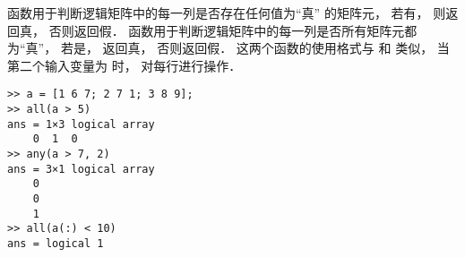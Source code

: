  函数用于判断逻辑矩阵中的每一列是否存在任何值为“真” 的矩阵元， 若有， 则返回真， 否则返回假．  函数用于判断逻辑矩阵中的每一列是否所有矩阵元都为“真”， 若是， 返回真， 否则返回假． 这两个函数的使用格式与  和  类似， 当第二个输入变量为  时， 对每行进行操作．
\begin{lstlisting}[language=MatlabCom]
>> a = [1 6 7; 2 7 1; 3 8 9];
>> all(a > 5)
ans = 1×3 logical array
    0  1  0
>> any(a > 7, 2)
ans = 3×1 logical array
    0
    0
    1
>> all(a(:) < 10)
ans = logical 1
\end{lstlisting}
